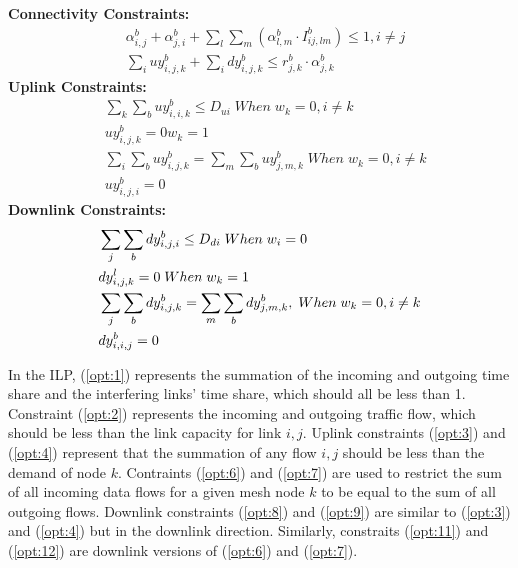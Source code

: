 \noindent
{\bf Connectivity Constraints:}
\begin{align}
\label{opt:1}
& \alpha_{i,j}^b + \alpha_{j,i}^b + \sum_l\sum_m(\alpha_{l,m}^b \cdot I_{ij,lm}^b) \leq 1, i\neq j \\
\label{opt:2}
& \sum_i uy_{i,j,k}^b + \sum_i dy_{i,j,k}^b \leq r_{j,k}^b \cdot \alpha_{j,k}^b 
\end{align}
\noindent
{\bf Uplink Constraints:} 
\begin{align}
\label{opt:3}
& \sum_k \sum_b uy_{i,i,k}^b \leq D_{ui} \; When \; w_k=0, i \neq k \\
\label{opt:4}
& uy_{i,j,k}^b = 0 w_k=1 \\
\label{opt:6}
& \sum_i\sum_b uy_{i,j,k}^b = \sum_m \sum_b uy_{j,m,k}^b \; When \; w_k=0, i \neq k\\
\label{opt:7}
& uy_{i,j,i}^b=0 
\end{align}
\noindent
{\bf Downlink Constraints:} 
\begin{align}
{\bf}
\label{opt:8}
& \sum_j \sum_b dy_{i,j,i}^b \leq D_{di} \; When \; w_i=0 \\
\label{opt:9}
& dy_{i,j,k}^l =0 \; When \; w_k=1 \\
\label{opt:11}
& \sum_j\sum_b dy_{i,j,k}^b = \sum_m \sum_b dy_{j,m,k}^b,\; When \; w_k=0,  i \neq k \\
\label{opt:12}
& dy_{i,i,j}^b=0
\end{align}

In the ILP, (\ref{opt:1}) represents the summation of the incoming and outgoing 
time share and the interfering links' time share, which should all be less than 1.
Constraint (\ref{opt:2}) represents the incoming and outgoing traffic flow, which 
should be less than the link capacity for link $i,j$. Uplink constraints (\ref{opt:3})
and (\ref{opt:4}) represent that the summation of any flow $i,j$ should be less than
the demand of node $k$.  Contraints (\ref{opt:6}) and (\ref{opt:7}) are used to restrict
the sum of all incoming data flows for a given mesh node $k$ to be equal to the 
sum of all outgoing flows. Downlink constraints (\ref{opt:8}) and (\ref{opt:9}) are
similar to (\ref{opt:3}) and (\ref{opt:4}) but in the downlink direction.  Similarly,
constraits (\ref{opt:11}) and (\ref{opt:12}) are downlink versions of (\ref{opt:6}) and (\ref{opt:7}).

